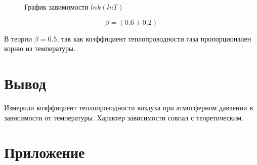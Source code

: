 \documentclass[a4paper, 12pt]{article}
\begin{document}
            \begin{figure}[ht]
                \caption{График завимимости $ln k (lnT)$}
                \label{lnk_graph}
            \end{figure}

            $$ \beta = (0.6 \pm 0.2) $$

            В теории $ \beta = 0.5$, так как коэффициент теплопроводности газа пропорционален корню из температуры.

    \section{Вывод}

        Измерили коэффициент теплопроводности воздуха при атмосферном давлении в зависимости от температуры. Характер зависимости совпал с теоретическим.

    \section{Приложение}
\end{document}
